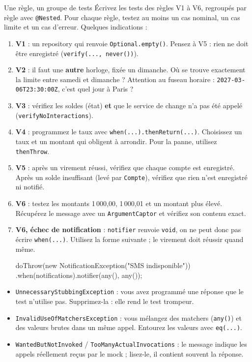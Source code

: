 \documentclass[11pt]{article}
\begin{document}
\begin{exobox}{Une règle, un groupe de tests}
Écrivez les tests des règles V1 à V6, regroupés par règle avec \texttt{@Nested}. Pour chaque règle, testez au moins un cas nominal, un cas limite et un cas d'erreur. Quelques indications :
\begin{enumerate}[leftmargin=1.4em]
  \item \textbf{V1} : un repository qui renvoie \texttt{Optional.empty()}. Pensez à V5 : rien ne doit être enregistré (\texttt{verify(..., never())}).
  \item \textbf{V2} : il faut une \textbf{autre} horloge, fixée un dimanche. Où se trouve exactement la limite entre samedi et dimanche ? Attention au fuseau horaire : \texttt{2027-03-06T23:30:00Z}, c'est quel jour à Paris ?
  \item \textbf{V3} : vérifiez les soldes (état) \textbf{et} que le service de change n'a pas été appelé (\texttt{verifyNoInteractions}).
  \item \textbf{V4} : programmez le taux avec \texttt{when(...).thenReturn(...)}. Choisissez un taux et un montant qui obligent à arrondir. Pour la panne, utilisez \texttt{thenThrow}.
  \item \textbf{V5} : après un virement réussi, vérifiez que chaque compte est enregistré. Après un solde insuffisant (levé par \texttt{Compte}), vérifiez que rien n'est enregistré ni notifié.
  \item \textbf{V6} : testez les montants 1\,000,00, 1\,000,01 et un montant plus élevé. Récupérez le message avec un \texttt{ArgumentCaptor} et vérifiez son contenu exact.
  \item \textbf{V6, échec de notification} : \texttt{notifier} renvoie \texttt{void}, on ne peut donc pas écrire \texttt{when(...)}. Utilisez la forme suivante ; le virement doit réussir quand même.
\begin{codebox}
doThrow(new NotificationException("SMS indisponible"))
    .when(notifications).notifier(any(), any());
\end{codebox}
\end{enumerate}
\end{exobox}

\begin{infobox}
\begin{itemize}[leftmargin=1.2em, itemsep=1pt]
  \item \texttt{UnnecessaryStubbingException} : vous avez programmé une réponse que le test n'utilise pas. Supprimez-la : elle rend le test trompeur.
  \item \texttt{InvalidUseOfMatchersException} : vous mélangez des matchers (\texttt{any()}) et des valeurs brutes dans un même appel. Entourez les valeurs avec \texttt{eq(...)}.
  \item \texttt{WantedButNotInvoked} / \texttt{TooManyActualInvocations} : le message indique les appels réellement reçus par le mock ; lisez-le, il contient souvent la réponse.
\end{itemize}
\end{infobox}
\end{document}
